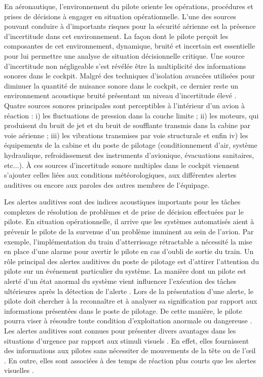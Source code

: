 En aéronautique, l'environnement du pilote oriente les opérations, procédures et prises de décisions à engager en situation opérationnelle. 
L'une des sources pouvant conduire à d'importants risques pour la sécurité aérienne est la présence d'incertitude dans cet environnement. 
La façon dont le pilote perçoit les composantes de cet environnement, dynamique, bruité et incertain est essentielle pour lui permettre une analyse de situation décisionnelle critique. 
Une source d'incertitude non négligeable s'est révélée être la multiplicité des informations sonores dans le cockpit. 
Malgré des techniques d'isolation avancées utilisées pour diminuer la quantité de nuisance sonore dans le cockpit, ce dernier reste un environnement acoustique bruité présentant un niveau d'incertitude élevé \citep{rotger1997confort}. 
Quatre sources sonores principales sont perceptibles à l’intérieur d’un avion à réaction : i) les fluctuations de pression dans la couche limite ; ii) les moteurs, qui produisent du bruit de jet et du bruit de soufflante transmis dans la cabine par voie aérienne ; iii) les vibrations transmises par voie structurale et enfin iv) les équipements de la cabine et du poste de pilotage (conditionnement d’air, système hydraulique, refroidissement des instruments d’avionique, évacuations sanitaires, etc...). 
À ces sources d'incertitude sonore multiples dans le cockpit viennent s'ajouter celles liées aux conditions météorologiques, aux différentes alertes auditives ou encore aux paroles des autres membres de l'équipage. 

Les alertes auditives sont des indices acoustiques importants pour les tâches complexes de résolution de problèmes et de prise de décision effectuées par le pilote. 
En situation opérationnelle, il arrive que les systèmes automatisés aient à prévenir le pilote de la survenue d'un problème imminent au sein de l'avion. 
Par exemple, l’implémentation du train d’atterrissage rétractable a nécessité la mise en place d’une alarme pour avertir le pilote en cas d’oubli de sortie du train. 
Un rôle principal des alertes auditives du poste de pilotage est d'attirer l'attention du pilote sur un événement particulier du système. 
La manière dont un pilote est alerté d'un état anormal du système vient influencer l'exécution des tâches ultérieures après la détection de l'alerte \citep{wickens2000signal}. 
Lors de la présentation d'une alerte, le pilote doit chercher à la reconnaître et à analyser sa signification par rapport aux informations présentées dans le poste de pilotage. 
De cette manière, le pilote pourra viser à résoudre toute condition d'exploitation anormale ou dangereuse \citep{peryer2005auditory, hawkins2017human, pritchett2017reviewing}. 
Les alertes auditives sont connues pour présenter divers avantages dans les situations d'urgence par rapport aux stimuli visuels \citep{dehais2012missing, scannella2013effects}. 
En effet, elles fournissent des informations aux pilotes sans nécessiter de mouvements de la tête ou de l'œil \citep{edworthy1991improving}. 
En outre, elles sont associées à des temps de réaction plus courts que les alertes visuelles \citep{stephan2000auditory, wheale1981speed}. 

